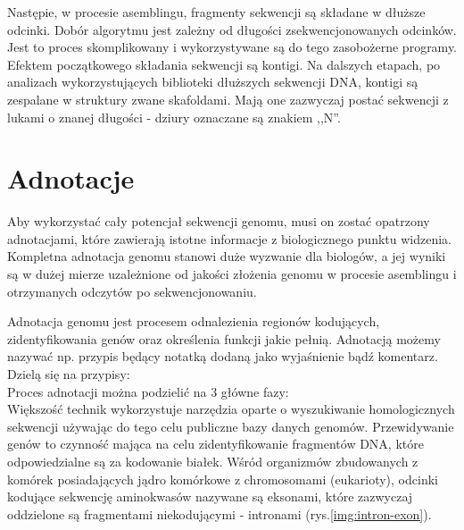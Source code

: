 Następie, w procesie asemblingu, fragmenty sekwencji są składane w dłuższe odcinki.
Dobór algorytmu jest zależny od długości zsekwencjonowanych odcinków.
Jest to proces skomplikowany i wykorzystywane są do tego zasobożerne programy. 
Efektem początkowego składania sekwencji są kontigi.
Na dalszych etapach, po analizach wykorzystujących biblioteki dłuższych sekwencji DNA, kontigi są zespalane w struktury zwane skafoldami.
Mają one zazwyczaj postać sekwencji z lukami o znanej długości - dziury oznaczane są znakiem ,,N''.

\section{Adnotacje}
Aby wykorzystać cały potencjał sekwencji genomu, musi on zostać opatrzony adnotacjami, które zawierają istotne informacje z biologicznego punktu widzenia.
Kompletna adnotacja genomu stanowi duże wyzwanie dla biologów, a jej wyniki są w dużej mierze uzależnione od jakości złożenia genomu w procesie asemblingu i otrzymanych odczytów po sekwencjonowaniu.

Adnotacja genomu jest procesem odnalezienia regionów kodujących, zidentyfikowania genów oraz określenia funkcji jakie pełnią.
Adnotacją możemy nazywać np. przypis będący notatką dodaną jako wyjaśnienie bądź komentarz. Dzielą się na przypisy:
\\
Proces adnotacji można podzielić na 3 główne fazy:
\\

Większość technik wykorzystuje narzędzia oparte o wyszukiwanie homologicznych sekwencji używając do tego celu publiczne bazy danych genomów.
Przewidywanie genów to czynność mająca na celu zidentyfikowanie fragmentów DNA, które odpowiedzialne są za kodowanie białek.
Wśród organizmów zbudowanych z komórek posiadających jądro komórkowe z chromosomami (eukarioty), odcinki kodujące sekwencję aminokwasów nazywane są eksonami, które zazwyczaj oddzielone są fragmentami niekodującymi - intronami (rys.\ref{img:intron-exon}).

